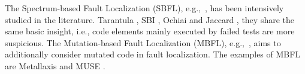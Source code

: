 The Spectrum-based Fault Localization
(SBFL), e.g.,~\cite{Ochiai,abreu2007accuracy,
	jones2005empirical,keller2017critical, liblit2005scalable,
	lucia2014extended,naish2011model, wong2007effective,
	zhang2011localizing}, has been intensively studied in the
literature.  Tarantula \cite{jones2001visualization}, SBI
\cite{liblit2005scalable}, Ochiai \cite{Ochiai} and Jaccard
\cite{abreu2007accuracy}, they share the same basic insight, i.e.,
code elements mainly executed by failed tests are more suspicious.
The Mutation-based Fault Localization (MBFL), e.g.,~\cite{budd1981mutation,MUSE,musco2017large,zhang2010test,
	zhang2013injecting},
aims to additionally consider mutated code in fault
localization.
The examples of MBFL are Metallaxis \cite{papadakis2012using,
	Metallaxis} and MUSE \cite{MUSE}.
%
\fi